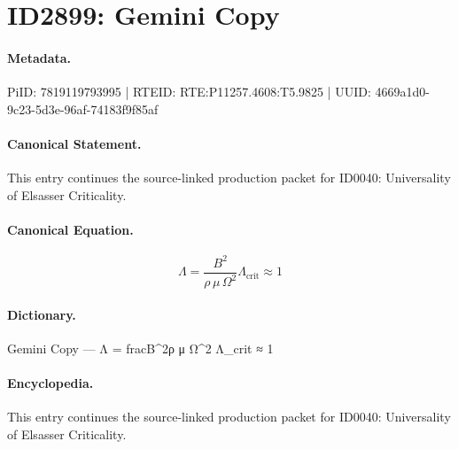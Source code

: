\section*{ID2899: Gemini Copy}
\paragraph{Metadata.}
PiID: 7819119793995 | RTEID: RTE:P11257.4608:T5.9825 | UUID: 4669a1d0-9c23-5d3e-96af-74183f9f85af

\paragraph{Canonical Statement.}
This entry continues the source-linked production packet for ID0040: Universality of Elsasser Criticality.

\paragraph{Canonical Equation.}
\[
\Lambda = \frac{B^{2}}{\rho\,\mu\,\Omega^{2}} \Lambda_{\mathrm{crit}} \approx 1
\]

\paragraph{Dictionary.}
Gemini Copy — Λ = fracB\textasciicircum{}2ρ μ Ω\textasciicircum{}2 Λ\_crit ≈ 1

\paragraph{Encyclopedia.}
This entry continues the source-linked production packet for ID0040: Universality of Elsasser Criticality.
